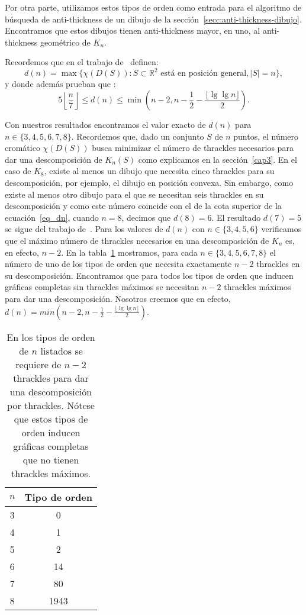   Por otra parte, utilizamos estos tipos de orden como entrada para el algoritmo de búsqueda de
  anti-thickness de un dibujo de la sección~\ref{secc:anti-thickness-dibujo}. Encontramos que estos
  dibujos tienen anti-thickness mayor, en uno, al anti-thickness geométrico de $K_n$.

  Recordemos que en el trabajo de~\cite{Araujo2005} definen:
  \[
  d(n) = \max\{\chi(D(S)): S\subset \mathbb{R}^2 \text{ está en posición general}, |S|=n\},
  \]
  y donde además prueban que :
  \begin{equation}\label{eq_dn}
  5\left\lfloor\frac{n}{7}\right\rfloor \leq d(n) \leq \min\left(n-2,n-\frac{1}{2}-\frac{\lfloor \lg \lg
  n\rfloor}{2}\right).
  \end{equation}

  Con nuestros resultados encontramos el valor exacto de $d(n)$ para
  $n\in\{3,4,5,6,7,8\}$. Recordemos que, dado un conjunto $S$ de $n$ puntos, el número cromático
  $\chi(D(S))$ busca minimizar el número de thrackles necesarios para dar una descomposición de $K_n(S)$ como explicamos en la sección~\ref{cap3}. En el caso de $K_8$, existe al menos un dibujo que necesita cinco thrackles para su descomposición, por ejemplo, el dibujo en posición convexa. Sin embargo, como existe al menos otro dibujo para el que se necesitan seis thrackles en su descomposición y como este número coincide con el de la cota superior de la ecuación~\ref{eq_dn}, cuando $n=8$, decimos que $d(8)=6$. El resultado $d(7)=5$ se sigue del trabajo  de~\cite{Araujo2005}. Para los valores de $d(n)$ con $n \in \{3,4,5,6\}$ verificamos que el máximo número de thrackles necesarios en una descomposición de $K_n$ es, en efecto, $n-2$. En la tabla~\ref{tabla_ds} mostramos, para cada $n \in \{3,4,5,6,7,8\}$ el número de uno de los tipos de orden que necesita exactamente $n-2$ thrackles en su descomposición. Encontramos que para
  todos los tipos de orden que inducen gráficas completas sin thrackles máximos se necesitan $n-2$
  thrackles máximos para dar una descomposición. Nosotros creemos que en efecto,
  $d(n)=min\left(n-2,n-\frac{1}{2}-\frac{\lfloor \lg \lg n\rfloor}{2}\right)$.
  \begin{table}
    \centering
    \begin{tabular}{|c|c|}
      \hline
      $n$ & Tipo de orden \\ \hline
      3   & 0 \\ \hline
      4   & 1 \\ \hline
      5   & 2 \\ \hline
      6   & 14 \\ \hline
      7   & 80 \\ \hline
      8   & 1943 \\ \hline
    \end{tabular}
    \caption{En los tipos de orden de $n$ listados se requiere de $n-2$ thrackles para dar una
    descomposición por thrackles. Nótese que estos tipos de orden inducen gráficas completas que no tienen
    thrackles máximos.}
    \label{tabla_ds}
  \end{table}

